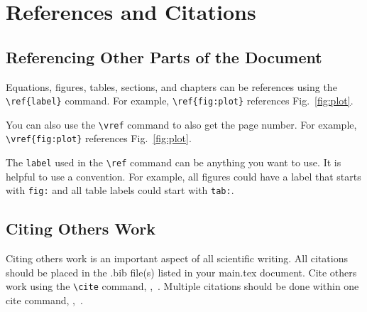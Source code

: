 \section{References and Citations}\label{Sect:ref_cite}

\subsection{Referencing Other Parts of the Document}\label{Sect:ref}
Equations, figures, tables, sections, and chapters can be references using the \verb|\ref{label}| command.  For example, \verb|\ref{fig:plot}| references Fig.~\ref{fig:plot}.  

You can also use the \verb|\vref| command to also get the page number.  For example, \verb|\vref{fig:plot}| references Fig.~\vref{fig:plot}.

The \verb|label| used in the \verb|\ref| command can be anything you want to use. It is helpful to use a convention.  For example, all figures could have a label that starts with \verb|fig:| and all table labels could start with \verb|tab:|.

\subsection{Citing Others Work}\label{Sect:cite}
Citing others work is an important aspect of all scientific writing.  All citations should be placed in the .bib file(s) listed in your main.tex document.  Cite others work using the \verb|\cite| command, \eg,~\cite{owkes_mesh-decoupled_2015}.  Multiple citations should be done within one cite command, \eg,~\cite{desjardins_direct_2013,owkes_discontinuous_2013,owkes_computational_2014}.  
